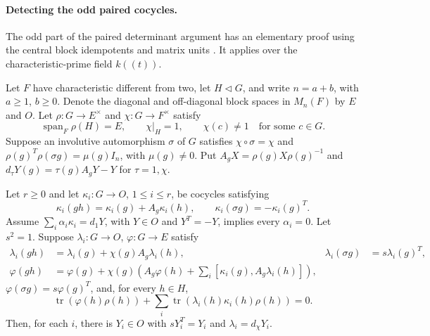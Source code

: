 \paragraph{Detecting the odd paired cocycles.}
The odd part of the paired determinant argument has an elementary
proof using the central block idempotents and matrix units
\cite{alpo-odd-detection}. It applies over the characteristic-prime
field $k((t))$.

Let $F$ have characteristic different from two, let $H\triangleleft G$,
and write $n=a+b$, with $a\geq1$, $b\geq0$. Denote the diagonal
and off-diagonal block spaces in $M_n(F)$ by $E$ and $O$.
Let $\rho:G\to E^\times$ and $\chi:G\to F^\times$ satisfy
\[
 \operatorname{span}_F\rho(H)=E,\qquad
 \chi|_H=1,\qquad \chi(c)\ne1\quad\text{for some }c\in G.
\]
Suppose an involutive automorphism $\sigma$ of $G$ satisfies
$\chi\circ\sigma=\chi$ and
$\rho(g)^T\rho(\sigma g)=\mu(g)I_n$, with $\mu(g)\ne0$.
Put $A_gX=\rho(g)X\rho(g)^{-1}$ and
$d_\tau Y(g)=\tau(g)A_gY-Y$ for $\tau=1,\chi$.

\begin{proposition}
\label{prop:selmer-odd-paired-detection}
Let $r\geq0$ and let $\kappa_i:G\to O$, $1\leq i\leq r$, be cocycles satisfying
\[
 \kappa_i(gh)=\kappa_i(g)+A_g\kappa_i(h),\qquad
 \kappa_i(\sigma g)=-\kappa_i(g)^T.
\]
Assume $\sum_i\alpha_i\kappa_i=d_1Y$, with $Y\in O$ and
$Y^T=-Y$, implies every $\alpha_i=0$.
Let $s^2=1$. Suppose $\lambda_i:G\to O$, $\varphi:G\to E$ satisfy
\[
 \begin{aligned}
 \lambda_i(gh)&=\lambda_i(g)+\chi(g)A_g\lambda_i(h),
 &\lambda_i(\sigma g)&=s\lambda_i(g)^T,\\
 \varphi(gh)&=\varphi(g)+\chi(g)\left(A_g\varphi(h)
       +\sum_i[\kappa_i(g),A_g\lambda_i(h)]\right),
 \end{aligned}
\]
$\varphi(\sigma g)=s\varphi(g)^T$, and, for every $h\in H$,
\[
 \operatorname{tr}(\varphi(h)\rho(h))
   +\sum_i\operatorname{tr}(\lambda_i(h)\kappa_i(h)\rho(h))=0.
\]
Then, for each $i$, there is $Y_i\in O$ with
$sY_i^T=Y_i$ and $\lambda_i=d_\chi Y_i$.
\end{proposition}

